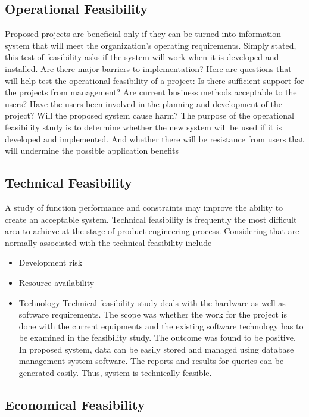 \documentclass[12pt]{article}
\begin{document}
\subsection{ Operational Feasibility}
Proposed projects are beneficial only if they can be turned into information system
that will meet the organization’s operating requirements. Simply stated, this test of
feasibility asks if the system will work when it is developed and installed. Are there
major barriers to implementation? Here are questions that will help test the operational
feasibility of a project:
Is there sufficient support for the projects from management?
Are current business methods acceptable to the users?
Have the users been involved in the planning and development of the project?
Will the proposed system cause harm? The purpose of the operational feasibility
study is to determine whether the new system will be used if it is developed and
implemented. And whether there will be resistance from users that will undermine the
possible application benefits
\subsection{Technical Feasibility}
A study of function performance and constraints may improve the ability to create an
acceptable system. Technical feasibility is frequently the most difficult area to achieve
at the stage of product engineering process. Considering that are normally associated
with the technical feasibility include
\begin{itemize}
\item Development risk
\item Resource availability
\item Technology Technical feasibility study deals with the hardware as well as software
requirements. The scope was whether the work for the project is done with the current
equipments and the existing software technology has to be examined in the feasibility
study. The outcome was found to be positive. In proposed system, data can be easily
stored and managed using database management system software. The reports and
results for queries can be generated easily. Thus, system is technically feasible.

\end{itemize}


\subsection{Economical Feasibility  }
\end{document}
